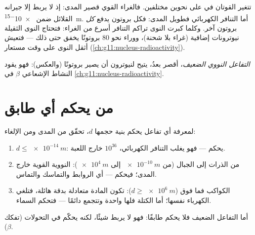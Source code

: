 \begin{remark}\label{rem:g11:fundamental-interactions:nuclei}
تتغير القوتان في  على نحوين مختلفين. فالغراء القوي
قصير المدى: إذ لا يربط  إلا جيرانه القلائل ضمن
\qty{e-15}{m}. أما التنافر الكهربائي فطويل المدى: فكل بروتون
يدفع \emph{كل} بروتون آخر. وكلما كبرت النوى تراكم التنافر
أسرع من الغراء: فتحتاج النوى الثقيلة نيوترونات إضافية (غراء
بلا شحنة)، ووراء نحو $80$ بروتونًا يخفق حتى ذلك --- فتعيش
أثقل النوى على وقت مستعار (\cref{ch:g11:nucleus-radioactivity}).
\end{remark}

\begin{definition}\label{def:g11:fundamental-interactions:weak}
\emph{التفاعل النووي الضعيف}،  أقصر
بعدُ، يتيح لنيوترون أن يصير بروتونًا (والعكس): فهو يقود
النشاط الإشعاعي $\beta$ في \cref{ch:g11:nucleus-radioactivity}.
\end{definition}

\section{من يحكم أي طابق}

\begin{method}[تدقيق سُلّم]\label{met:g11:fundamental-interactions:audit}
لمعرفة أي تفاعل يحكم بنية حجمها $d$، تحقّق من المدى
ومن الإلغاء:
\begin{enumerate}
  \item $d \leq \qty{e-14}{m}$: يحكم \emph{} ---
        فهو يغلب التنافر الكهربائي،  $10^{36}$ خارج اللعبة.
  \item من الذرات إلى الجبال (من $\qty{e-10}{m}$ إلى $\qty{e4}{m}$):
         النووية القوية خارج المدى؛ فيحكم \emph{} --- أي الروابط والتماسك  والتماس.
  \item الكواكب فما فوق ($d \geq \qty{e6}{m}$): تكون المادة متعادلة بدقة
        هائلة، فتلغي الكهرباء نفسها؛ أما الكتلة فلها
         واحدة وتتجمع دائمًا --- فتحكم \emph{} السماء.
\end{enumerate}
أما التفاعل الضعيف فلا يحكم طابقًا: فهو لا يربط شيئًا، لكنه يحكّم في
التحولات (تفكك $\beta$).
\end{method}

